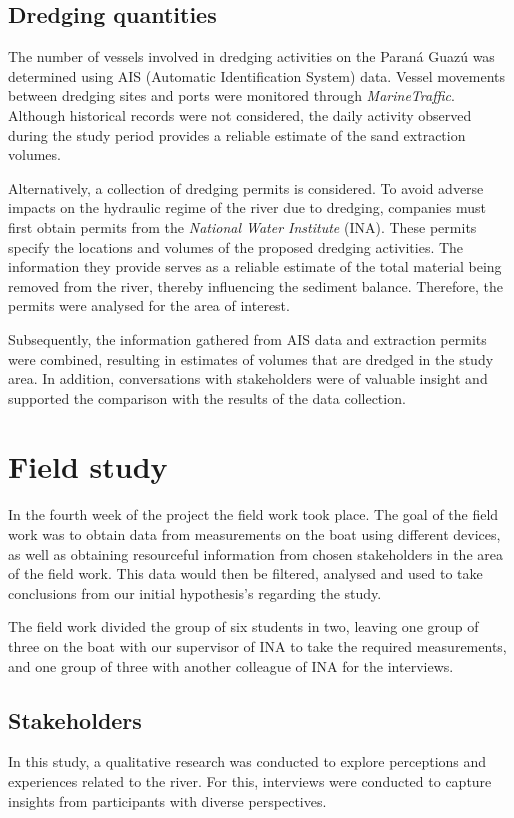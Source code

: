 \subsection{Dredging quantities}
The number of vessels involved in dredging activities on the Paraná Guazú was determined using AIS (Automatic Identification System) data. Vessel movements between dredging sites and ports were monitored through \textit{MarineTraffic}. Although historical records were not considered, the daily activity observed during the study period provides a reliable estimate of the sand extraction volumes. 

Alternatively, a collection of dredging permits is considered. To avoid adverse impacts on the hydraulic regime of the river due to dredging, companies must first obtain permits from the \textit{National Water Institute }(INA). These permits specify the locations and volumes of the proposed dredging activities. The information they provide serves as a reliable estimate of the total material being removed from the river, thereby influencing the sediment balance. Therefore, the permits were analysed for the area of interest.

Subsequently, the information gathered from AIS data and extraction permits were combined, resulting in estimates of volumes that are dredged in the study area. In addition, conversations with stakeholders were of valuable insight and supported the comparison with the results of the data collection. 

\section{Field study}
In the fourth week of the project the field work took place. The goal of the field work was to obtain data from measurements on the boat using different devices, as well as obtaining resourceful information from chosen stakeholders in the area of the field work. This data would then be filtered, analysed and used to take conclusions from our initial hypothesis's regarding the study.

The field work divided the group of six students in two, leaving one group of three on the boat with our supervisor of INA to take the required measurements, and one group of three with another colleague of INA for the interviews.

\subsection{Stakeholders}
\label{sec:stakeholder methods}
In this study, a qualitative research was conducted to explore perceptions and experiences related to the river. For this, interviews were conducted to capture insights from participants with diverse perspectives.

